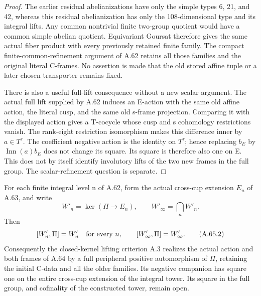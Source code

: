 \begin{proof}
The earlier residual abelianizations have only the simple types
6, 21, and 42, whereas this residual abelianization has only the
108-dimensional type and its integral lifts. Any common nontrivial
finite two-group quotient would have a common simple abelian
quotient. Equivariant Goursat therefore gives the same actual fiber
product with every previously retained finite family. The compact
finite-common-refinement argument of A.62 retains all those families
and the original literal C-frames. No assertion is made that the
old stored affine tuple or a later chosen transporter remains fixed.

There is also a useful full-lift consequence without a new scalar
argument. The actual full lift supplied by A.62 induces an E-action
with the same old affine action, the literal cusp, and the same
old s-frame projection. Comparing it with the displayed action gives
a T-cocycle whose cusp and s cohomology restrictions vanish. The
rank-eight restriction isomorphism makes this difference inner by
\(a\in T^\tau\). The coefficient negative action is the identity
on \(T^\tau\); hence replacing \(b_E\) by \(\operatorname{Inn}(a)b_E\)
does not change its square. Its square is therefore also one on E.
This does not by itself identify involutory lifts of the two new
frames in the full group. The scalar-refinement question is separate.
\end{proof}

For each finite integral level n of A.62, form the actual cross-cup
extension \(E_n\) of A.63, and write
\[
 W'_n=\ker(\Pi\longrightarrow E_n),\qquad
 W'_\infty=\bigcap_n W'_n.
 \tag{A.65.1}
\]
Then
\[
 [W'_n,\Pi]=W'_n\quad\hbox{for every }n,
 \qquad [W'_\infty,\Pi]=W'_\infty.
 \tag{A.65.2}
\]
Consequently the closed-kernel lifting criterion A.3 realizes the
actual action and both frames of A.64 by a full peripheral positive
automorphism of \(\Pi\), retaining the initial C-data and all the
older families. Its negative companion has square one on the entire
cross-cup extension of the integral tower. Its square in the full
group, and cofinality of the constructed tower, remain open.

